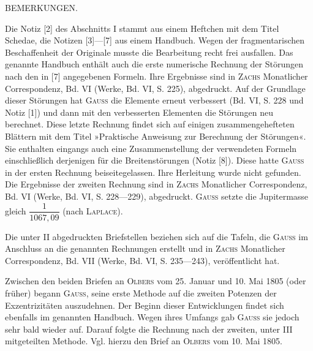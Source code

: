 \par\bigskip{}
\begin{center}BEMERKUNGEN.\end{center}
\begingroup\small
\noindent\hspace*{\parindent}Die Notiz [2] des Abschnitts I stammt aus einem Heftchen mit dem Titel Schedae, die Notizen [3]---[7] aus einem Handbuch. Wegen der fragmentarischen Beschaffenheit der Originale musste die Bearbeitung recht frei ausfallen. Das genannte Handbuch enthält auch die erste numerische Rechnung der Störungen nach den in [7] angegebenen Formeln. Ihre Ergebnisse sind in \textsc{Zachs} Monatlicher Correspondenz, Bd. VI (Werke, Bd. VI, S. 225), abgedruckt. Auf der Grundlage dieser Störungen hat \textsc{Gauss} die Elemente erneut verbessert (Bd. VI, S. 228 und Notiz [1]) und dann mit den verbesserten Elementen die Störungen neu berechnet. Diese letzte Rechnung findet sich auf einigen zusammengehefteten Blättern mit dem Titel »Praktische Anweisung zur Berechnung der Störungen«. Sie enthalten eingangs auch eine Zusammenstellung der verwendeten Formeln einschließlich derjenigen für die Breitenstörungen (Notiz [8]). Diese hatte \textsc{Gauss} in der ersten Rechnung beiseitegelassen. Ihre Herleitung wurde nicht gefunden. Die Ergebnisse der zweiten Rechnung sind in \textsc{Zachs} Monatlicher Correspondenz, Bd. VI (Werke, Bd. VI, S. 228---229), abgedruckt. \textsc{Gauss} setzte die Jupitermasse gleich \(\dfrac{1}{1067{,}09}\) (nach \textsc{Laplace}).

Die unter II abgedruckten Briefstellen beziehen sich auf die Tafeln, die \textsc{Gauss} im Anschluss an die genannten Rechnungen erstellt und in \textsc{Zachs} Monatlicher Correspondenz, Bd. VII (Werke, Bd. VI, S. 235---243), veröffentlicht hat.

Zwischen den beiden Briefen an \textsc{Olbers} vom 25. Januar und 10. Mai 1805 (oder früher) begann \textsc{Gauss}, seine erste Methode auf die zweiten Potenzen der Exzentrizitäten auszudehnen. Der Beginn dieser Entwicklungen findet sich ebenfalls im genannten Handbuch. Wegen ihres Umfangs gab \textsc{Gauss} sie jedoch sehr bald wieder auf. Darauf folgte die Rechnung nach der zweiten, unter III mitgeteilten Methode. Vgl. hierzu den Brief an \textsc{Olbers} vom 10. Mai 1805.

